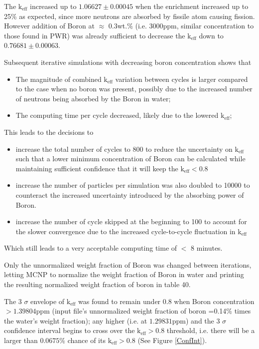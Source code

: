 \documentclass[a4paper, 12pt]{article}
\begin{document}
The $\text{k}_{\text{eff}}$ increased up to $1.06627 \pm 0.00045$ when the enrichment increased up to 25\% as expected, since more neutrons are absorbed by fissile atom causing fission. However addition of Boron at $\approx$ 0.3wt.\% (i.e. 3000ppm, similar concentration to those found in PWR) was already sufficient to decrease the $\text{k}_{\text{eff}}$ down to $0.76681 \pm 0.00063$.

Subsequent iterative simulations with decreasing boron concentration shows that
\begin{itemize}
 	\item The magnitude of combined $\text{k}_{\text{eff}}$ variation between cycles is larger compared to the case when no boron was present, possibly due to the increased number of neutrons being absorbed by the Boron in water;
	\item The computing time per cycle decreased, likely due to the lowered $\text{k}_{\text{eff}}$;
\end{itemize} 
This leads to the decisions to 
\begin{itemize}
	\item increase the total number of cycles to 800 to reduce the uncertainty on $\text{k}_{\text{eff}}$ such that a lower minimum concentration of Boron can be calculated while maintaining sufficient confidence that it will keep the $\text{k}_{\text{eff}} < 0.8 $
	\item increase the number of particles per simulation was also doubled to 10000 to counteract the increased uncertainty introduced by the absorbing power of Boron.
	\item increase the number of cycle skipped at the beginning to 100 to account for the slower convergence due to the increased cycle-to-cycle fluctuation in $\text{k}_{\text{eff}}$
\end{itemize}
Which still leads to a very acceptable computing time of  $<$ 8 minutes.

Only the unnormalized weight fraction of Boron was changed between iterations, letting MCNP to normalize the weight fraction of Boron in water and printing the resulting normalized weight fraction of boron in table 40.

The 3 $\sigma$ envelope of $\text{k}_{\text{eff}}$ was found to remain under 0.8 when Boron concentration $>1.39804$ppm (input file's unnormalized weight fraction of boron =0.14\% times the water's weight fraction); any higher (i.e. at $1.29831$ppm) and the 3 $\sigma$ confidence interval begins to cross over the $\text{k}_{\text{eff}}>0.8$ threshold, i.e. there will be a larger than $0.0675 \%$ chance of its $\text{k}_{\text{eff}} >0.8$ (See Figure \ref{ConfInt}).
\end{document}
